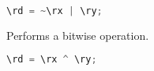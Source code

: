 \begin{lstlisting}[numbers=none, basicstyle=\ttfamily\footnotesize, language=C++]
\rd = ~\rx | \ry;
\end{lstlisting}

Performs a bitwise  operation.

\begin{lstlisting}[numbers=none, basicstyle=\ttfamily\footnotesize, language=C++]
\rd = \rx ^ \ry;
\end{lstlisting}
